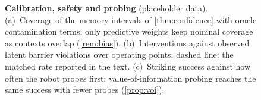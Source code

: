 \begin{figure}[t]
\caption{\textbf{Calibration, safety and probing} (placeholder data). (a)~Coverage of the memory intervals of \cref{thm:confidence} with oracle contamination terms; only predictive weights keep nominal coverage as contexts overlap (\cref{rem:bias}). (b)~Interventions against observed latent barrier violations over operating points; dashed line: the matched rate reported in the text. (c)~Striking success against how often the robot probes first; value-of-information probing reaches the same success with fewer probes (\cref{prop:voi}).}
\label{fig:safety}
\end{figure}
